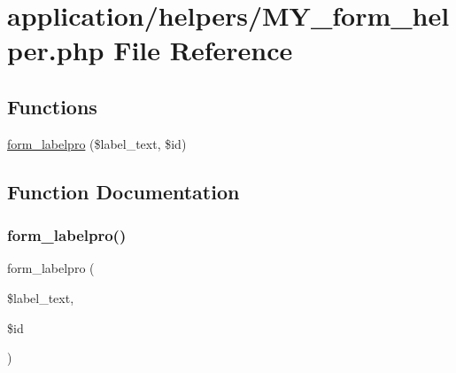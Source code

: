 \hypertarget{_m_y__form__helper_8php}{}\section{application/helpers/\+M\+Y\+\_\+form\+\_\+helper.php File Reference}
\label{_m_y__form__helper_8php}
\subsection*{Functions}
\begin{DoxyCompactItemize}
\item 
\mbox{\hyperlink{_m_y__form__helper_8php_a7833a0ae435cb41bad6e5d41e84e6660}{form\+\_\+labelpro}} (\$label\+\_\+text, \$id)
\end{DoxyCompactItemize}


\subsection{Function Documentation}
\mbox{\label{_m_y__form__helper_8php_a7833a0ae435cb41bad6e5d41e84e6660}} 
\subsubsection{\texorpdfstring{form\+\_\+labelpro()}{form\_labelpro()}}
{\footnotesize\ttfamily form\+\_\+labelpro (\begin{DoxyParamCaption}\item[{}]{\$label\+\_\+text,  }\item[{}]{\$id }\end{DoxyParamCaption})}

